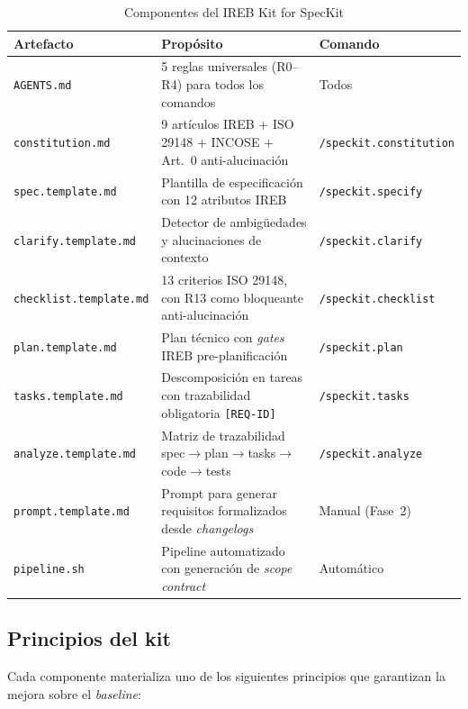 \begin{table}[htbp]
\centering
\caption{Componentes del IREB Kit for SpecKit}
\label{tab:ireb-kit}
\begin{tabularx}{\textwidth}{lXl}
\toprule
\textbf{Artefacto} & \textbf{Prop\'osito} & \textbf{Comando} \\
\midrule
\texttt{AGENTS.md} & 5 reglas universales (R0--R4) para todos los comandos & Todos \\
\texttt{constitution.md} & 9 art\'iculos IREB + ISO 29148 + INCOSE + Art.~0 anti-alucinaci\'on & \texttt{/speckit.constitution} \\
\texttt{spec.template.md} & Plantilla de especificaci\'on con 12 atributos IREB & \texttt{/speckit.specify} \\
\texttt{clarify.template.md} & Detector de ambig\"uedades y alucinaciones de contexto & \texttt{/speckit.clarify} \\
\texttt{checklist.template.md} & 13 criterios ISO 29148, con R13 como bloqueante anti-alucinaci\'on & \texttt{/speckit.checklist} \\
\texttt{plan.template.md} & Plan t\'ecnico con \emph{gates} IREB pre-planificaci\'on & \texttt{/speckit.plan} \\
\texttt{tasks.template.md} & Descomposici\'on en tareas con trazabilidad obligatoria \texttt{[REQ-ID]} & \texttt{/speckit.tasks} \\
\texttt{analyze.template.md} & Matriz de trazabilidad spec$\rightarrow$plan$\rightarrow$tasks$\rightarrow$code$\rightarrow$tests & \texttt{/speckit.analyze} \\
\texttt{prompt.template.md} & Prompt para generar requisitos formalizados desde \emph{changelogs} & Manual (Fase~2) \\
\texttt{pipeline.sh} & Pipeline automatizado con generaci\'on de \emph{scope contract} & Autom\'atico \\
\bottomrule
\end{tabularx}
\end{table}

\subsection{Principios del kit}

Cada componente materializa uno de los siguientes principios que garantizan la mejora sobre el \emph{baseline}:

